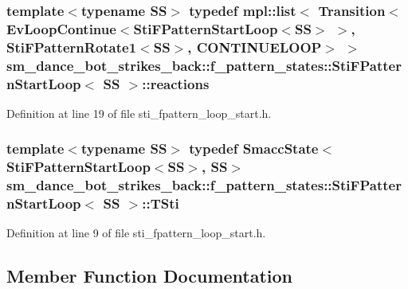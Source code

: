\subsubsection[{\texorpdfstring{reactions}{reactions}}]{\setlength{\rightskip}{0pt plus 5cm}template$<$typename SS$>$ typedef mpl\+::list$<$ Transition$<$Ev\+Loop\+Continue$<${\bf Sti\+F\+Pattern\+Start\+Loop}$<$SS$>$ $>$, {\bf Sti\+F\+Pattern\+Rotate1}$<$SS$>$, C\+O\+N\+T\+I\+N\+U\+E\+L\+O\+OP$>$ $>$ {\bf sm\+\_\+dance\+\_\+bot\+\_\+strikes\+\_\+back\+::f\+\_\+pattern\+\_\+states\+::\+Sti\+F\+Pattern\+Start\+Loop}$<$ SS $>$\+::{\bf reactions}}\hypertarget{structsm__dance__bot__strikes__back_1_1f__pattern__states_1_1StiFPatternStartLoop_af8a53959f08045ab01af476040e5f76b}{}\label{structsm__dance__bot__strikes__back_1_1f__pattern__states_1_1StiFPatternStartLoop_af8a53959f08045ab01af476040e5f76b}


Definition at line 19 of file sti\+\_\+fpattern\+\_\+loop\+\_\+start.\+h.

\subsubsection[{\texorpdfstring{T\+Sti}{TSti}}]{\setlength{\rightskip}{0pt plus 5cm}template$<$typename SS$>$ typedef {\bf Smacc\+State}$<${\bf Sti\+F\+Pattern\+Start\+Loop}$<$SS$>$, SS$>$ {\bf sm\+\_\+dance\+\_\+bot\+\_\+strikes\+\_\+back\+::f\+\_\+pattern\+\_\+states\+::\+Sti\+F\+Pattern\+Start\+Loop}$<$ SS $>$\+::{\bf T\+Sti}}\hypertarget{structsm__dance__bot__strikes__back_1_1f__pattern__states_1_1StiFPatternStartLoop_a3c1089e9485fca72295426898cb9e3d8}{}\label{structsm__dance__bot__strikes__back_1_1f__pattern__states_1_1StiFPatternStartLoop_a3c1089e9485fca72295426898cb9e3d8}


Definition at line 9 of file sti\+\_\+fpattern\+\_\+loop\+\_\+start.\+h.



\subsection{Member Function Documentation}
